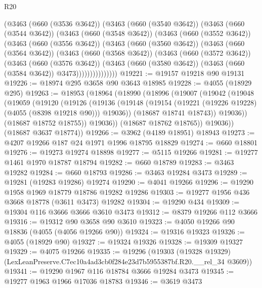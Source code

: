 \begin{lexlean}{R20}
\begin{coremodule}
        (@3463
          (@660 (@3536 @3642))
          (@3463
            (@660 (@3540 @3642))
            (@3463
              (@660 (@3544 @3642))
              (@3463
                (@660 (@3548 @3642))
                (@3463
                  (@660 (@3552 @3642))
                  (@3463
                    (@660 (@3556 @3642))
                    (@3463
                      (@660 (@3560 @3642))
                      (@3463
                        (@660 (@3564 @3642))
                        (@3463
                          (@660 (@3568 @3642))
                          (@3463
                            (@660 (@3572 @3642))
                            (@3463
                              (@660 (@3576 @3642))
                              (@3463
                                (@660 (@3580 @3642))
                                (@3463 (@660 (@3584 @3642)) @3473)))))))))))))))
@19221 := @19157 @19218 @90 @19131
@19226 := @18974 @295 @3658 @90 @3643 @18985
@19228 := @4055 (@18929 @295)
@19263 := @18953
    (@18964
      (@18990
        (@18996
          (@19007
            (@19042
              (@19048
                (@19059
                  (@19120
                    (@19126
                      (@19136
                        (@19148 (@19154 (@19221 (@19226 @19228) (@4055 (@8398 @19218 @90))) @19036))
                        (@18687 @18741 @18743))
                      @19036))
                  (@18687 @18752 @18755))
                @19036))
            (@18687 @18762 @18765))
          @19036))
      (@18687 @3637 @18774))
@19266 := @3962 (@4189 @18951) @18943
@19273 := @4207 @19266 @187 @24 @1971 @1996 @18795 @18829
@19274 := @660 @18801
@19276 := @19273 @19274 @18898
@19277 := @5115 @19266
@19281 := @19277 @1461 @1970 @18787 @18794
@19282 := @660 @18789
@19283 := @3463 @19282
@19284 := @660 @18793
@19286 := @3463 @19284 @3473
@19289 := @19281 (@19283 @19286) @19274
@19290 := @4041 @19266
@19296 := @19290 @1958 @1969 @18779 @18786 @19282 @19286
@19303 := @19277 @1956 @436 @3668 @18778 (@3611 @3473) @19282
@19304 := @19290 @434
@19309 := @19304 @116 @3666 @3666 @3610 @3473
@19312 := @8379 @19266 @112 @3666
@19316 := @19312 @90 @3658 @90 @3610
@19323 := @4050 @19266 @90 @18836 (@4055 (@4056 @19266 @90))
@19324 := @19316 @19323
@19326 := @4055 (@18929 @90)
@19327 := @19324 @19326
@19328 := @19309 @19327
@19329 := @4075 @19266
@19335 := @19296
    (@19303 (@19328 @19329) (LexLeanPreserve.C7ec10a4ad3cb0f284e23d7b5955387bf.R20.__rel_34 @3609))
@19341 := @19290 @1967 @116 @18784 @3666 @19284 @3473
@19345 := @19277 @1963 @1966 @17036 @18783
@19346 := @3619 @3473

\end{coremodule}
\end{lexlean}

